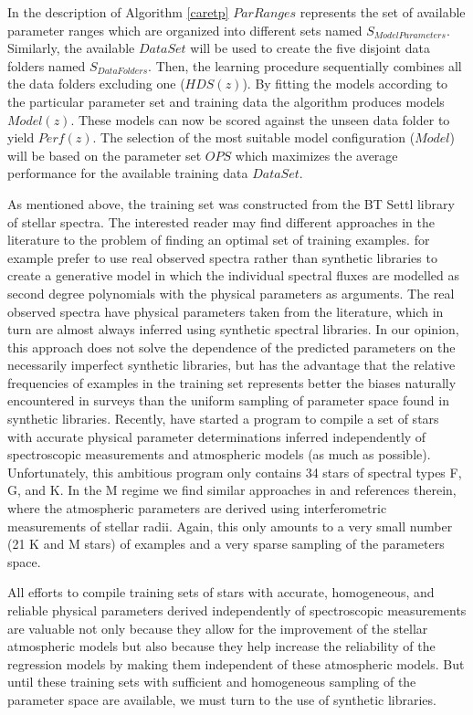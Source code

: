 In the description of Algorithm \ref{caretp} $ParRanges$ represents
the set of available parameter ranges which are organized into
different sets named $S_{ModelParameters}$.  Similarly, the available
$DataSet$ will be used to create the five disjoint data folders named
$S_{DataFolders}$. Then, the learning procedure sequentially combines
all the data folders excluding one ($HDS(z)$).  By fitting the models
according to the particular parameter set and training data the
algorithm produces models $Model(z)$. These models can now be scored
against the unseen data folder to yield $Perf(z)$.  The selection of
the most suitable model configuration ($Model$) will be based on the
parameter set $OPS$ which maximizes the average performance for the
available training data $DataSet$.

As mentioned above, the training set was constructed from the BT Settl
library of stellar spectra. The interested reader may find different
approaches in the literature to the problem of finding an optimal set
of training examples. \cite{hoggCannon} for example prefer to use real
observed spectra rather than synthetic libraries to create a
generative model in which the individual spectral fluxes are modelled
as second degree polynomials with the physical parameters as
arguments. The real observed spectra have physical parameters taken
from the literature, which in turn are almost always inferred using
synthetic spectral libraries. In our opinion, this approach does not
solve the dependence of the predicted parameters on the necessarily
imperfect synthetic libraries, but has the advantage that the relative
frequencies of examples in the training set represents better the
biases naturally encountered in surveys than the uniform sampling of
parameter space found in synthetic libraries. Recently, \cite{heiter}
have started a program to compile a set of stars with accurate
physical parameter determinations inferred independently of
spectroscopic measurements and atmospheric models (as much as
possible). Unfortunately, this ambitious program only contains 34
stars of spectral types F, G, and K. In the M regime we find similar
approaches in \cite{2014AJ....147...47B} and references therein, where
the atmospheric parameters are derived using interferometric
measurements of stellar radii. Again, this only amounts to a very
small number (21 K and M stars) of examples and a very sparse sampling
of the parameters space.

All efforts to compile training sets of stars with accurate,
homogeneous, and reliable physical parameters derived independently of
spectroscopic measurements are valuable not only because they allow
for the improvement of the stellar atmospheric models but also because
they help increase the reliability of the regression models by making
them independent of these atmospheric models. But until these training
sets with sufficient and homogeneous sampling of the parameter space
are available, we must turn to the use of synthetic libraries.
